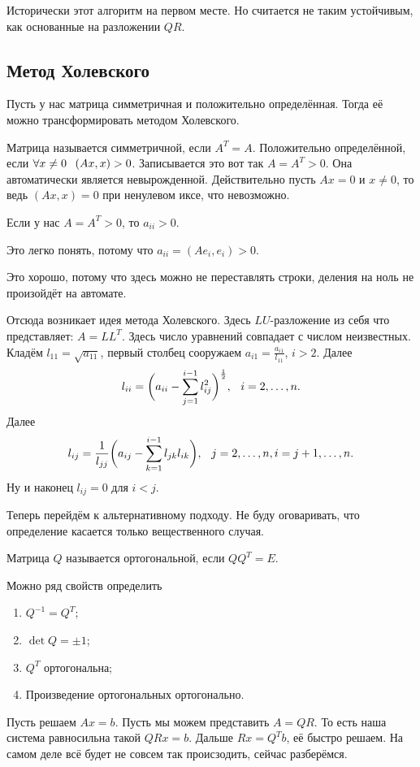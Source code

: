 Исторически этот алгоритм на первом месте. Но считается не таким устойчивым, как основанные на разложении $QR$.

\subsection{Метод Холевского}
Пусть у нас матрица симметричная и положительно определённая. Тогда её можно трансформировать методом Холевского. 

Матрица называется симметричной, если $A^T = A$. Положительно определённой, если $\forall x\ne 0\pau (Ax,x)>0$. Записывается это вот так $A  = A^T >0$. Она автоматически является невырожденной. Действительно пусть $Ax = 0$ и $x\ne 0$, то ведь $(Ax,x)=0$ при ненулевом иксе, что невозможно.

\begin{Ut}
Если у нас $A = A^T>0$, то $a_{ii}>0$.
\end{Ut}
Это легко понять, потому что $a_{ii} = (Ae_i,e_i)>0$.

Это хорошо, потому что здесь можно не переставлять строки, деления на ноль не произойдёт на автомате.

Отсюда возникает идея метода Холевского. Здесь $LU$-разложение из себя что представляет: $A = LL^T$. Здесь число уравнений совпадает с числом неизвестных. Кладём $l_{11} = \sqrt{a_{11}}$, первый столбец сооружаем $a_{i1} = \frac{a_{i1}}{l_11}$, $i>2$. Далее
\[
  l_{ii} = \bigg(a_{ii} - \RY j1{i-1} l^2_{ij}\bigg)^{\frac12},\pau i=2,\dots,n.
\]
Далее
\[
  l_{ij} = \frac1{l_{jj}} \bigg( a_{ij} - \sum\limits_{k = 1}^{i-1} l_{jk}l_{ik}\bigg),\hskip .75em plus.1em minus.08em\relax j=2,\dots,n, i = j+1,\dots,n.
\]
Ну и наконец $l_{ij}=0$ для $i<j$.

Теперь перейдём к альтернативному подходу. Не буду оговаривать, что определение касается только вещественного случая.
\begin{Def}
  Матрица $Q$ называется ортогональной, если $QQ^T = E$.
\end{Def}
Можно ряд свойств определить
\begin{enumerate}
\item $Q^{-1} = Q^T$;
\item $\det Q = \pm 1$;
\item $Q^T$ ортогональна;
\item Произведение ортогональных ортогонально.
\end{enumerate}

Пусть решаем $Ax=b$. Пусть мы можем представить $A = QR$. То есть наша система равносильна такой $QRx = b$. Дальше $Rx = Q^T b$, её быстро решаем. На самом деле всё будет не совсем так происзодить, сейчас разберёмся.

